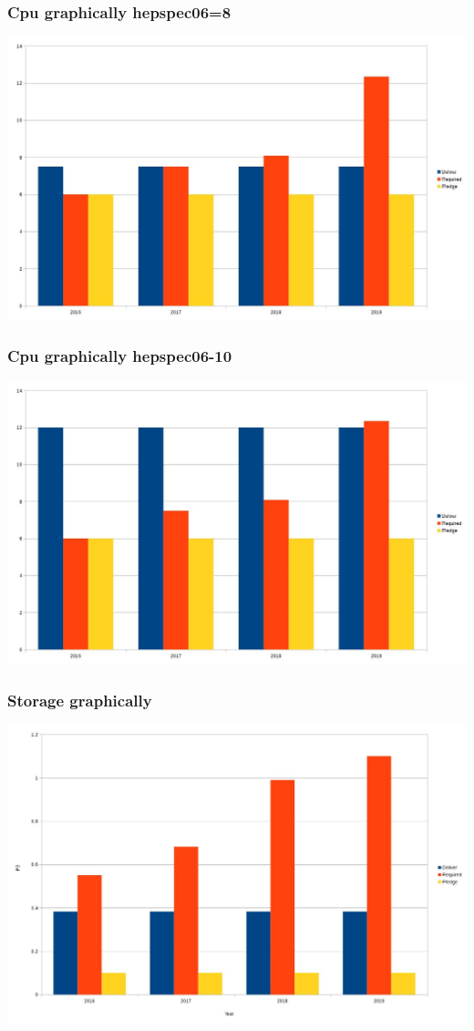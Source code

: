 \documentclass{beamer}
\begin{document}
\begin{frame}
    \frametitle{Cpu graphically hepspec06=8}
    \includegraphics[scale=0.25]{CPUPledge-8.jpg}
\end{frame}
\begin{frame}
    \frametitle{Cpu graphically hepspec06-10}
    \includegraphics[scale=0.25]{CPUPledge-10.jpg}
\end{frame}
\begin{frame}
    \frametitle{Storage graphically}
    \includegraphics[scale=0.25]{StoragePledge.jpg}
\end{frame}
\end{document}

